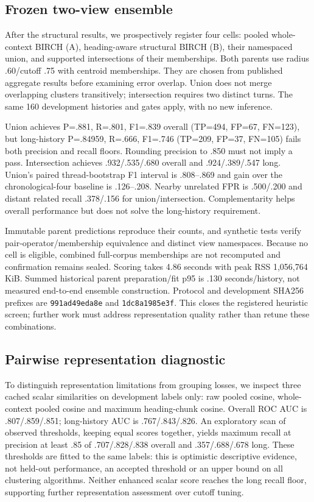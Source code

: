 \documentclass[11pt]{article}
\begin{document}
\subsection{Frozen two-view ensemble}
After the structural results, we prospectively register four cells: pooled
whole-context BIRCH (A), heading-aware structural BIRCH (B), their namespaced
union, and supported intersections of their memberships. Both parents use
radius .60/cutoff .75 with centroid memberships. They are chosen from published
aggregate results before examining error overlap. Union does not merge
overlapping clusters transitively; intersection requires two distinct turns.
The same 160 development histories and gates apply, with no new inference.

Union achieves P=.881, R=.801, F1=.839 overall (TP=494, FP=67, FN=123), but
long-history P=.84959, R=.666, F1=.746 (TP=209, FP=37, FN=105) fails both
precision and recall floors. Rounding precision to .850 must not imply a pass.
Intersection achieves .932/.535/.680 overall and .924/.389/.547 long.
Union's paired thread-bootstrap F1 interval is .808--.869 and gain over the
chronological-four baseline is .126--.208. Nearby unrelated FPR is .500/.200
and distant related recall .378/.156 for union/intersection. Complementarity
helps overall performance but does not solve the long-history requirement.

Immutable parent predictions reproduce their counts, and synthetic tests
verify pair-operator/membership equivalence and distinct view namespaces.
Because no cell is eligible, combined full-corpus memberships are not
recomputed and confirmation remains sealed. Scoring takes 4.86 seconds with
peak RSS 1,056,764 KiB. Summed historical parent preparation/fit p95 is .130
seconds/history, not measured end-to-end ensemble construction. Protocol and
development SHA256 prefixes are \texttt{991ad49eda8e} and
\texttt{1dc8a1985e3f}. This closes the registered heuristic screen; further work
must address representation quality rather than retune these combinations.

\subsection{Pairwise representation diagnostic}
To distinguish representation limitations from grouping losses, we inspect
three cached scalar similarities on development labels only: raw pooled cosine,
whole-context pooled cosine and maximum heading-chunk cosine. Overall ROC AUC
is .807/.859/.851; long-history AUC is .767/.843/.826. An exploratory scan of
observed thresholds, keeping equal scores together, yields maximum recall at
precision at least .85 of .707/.828/.838 overall and .357/.688/.678 long.
These thresholds are fitted to the same labels: this is optimistic descriptive
evidence, not held-out performance, an accepted threshold or an upper bound on
all clustering algorithms. Neither enhanced scalar score reaches the long
recall floor, supporting further representation assessment over cutoff tuning.
\end{document}
